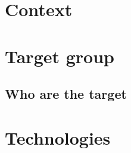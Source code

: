 	\section{Context}
		
	\section{Target group}\label{sec:targetGroup}
		\subsection{Who are the target }
		
	\section{Technologies}\label{sec:technologies}
